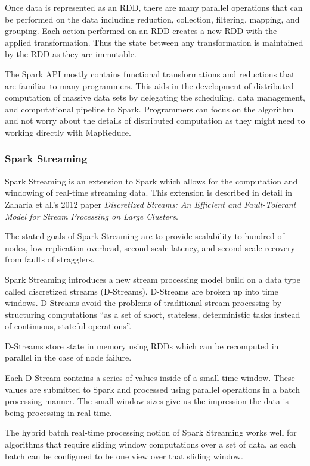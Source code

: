 \documentclass[]{article}
\begin{document}
Once data is represented as an RDD, there are many parallel operations that can be performed on the data including reduction, collection, filtering, mapping, and grouping. Each action performed on an RDD creates a new RDD with the applied transformation. Thus the state between any transformation is maintained by the RDD as they are immutable.

The Spark API mostly contains functional transformations and reductions that are familiar to many programmers. This aids in the development of distributed computation of massive data sets by delegating the scheduling, data management, and computational pipeline to Spark. Programmers can focus on the algorithm and not worry about the details of distributed computation as they might need to working directly with MapReduce.

\subsubsection{Spark Streaming}
Spark Streaming is an extension to Spark which allows for the computation and windowing of real-time streaming data. This extension is described in detail in Zaharia et al.'s 2012 paper \textit{Discretized Streams: An Efficient and Fault-Tolerant Model for Stream Processing on Large Clusters}\cite{zaharia2012discretized}.

The stated goals of Spark Streaming are to provide scalability to hundred of nodes, low replication overhead, second-scale latency, and second-scale recovery from faults of stragglers.

Spark Streaming introduces a new stream processing model build on a data type called discretized streams (D-Streams). D-Streams are broken up into time windows. D-Streams avoid the problems of traditional stream processing by structuring computations ``as a set of short, stateless, deterministic tasks instead of continuous, stateful operations''.

D-Streams store state in memory using RDDs which can be recomputed in parallel in the case of node failure. 

Each D-Stream contains a series of values inside of a small time window. These values are submitted to Spark and processed using parallel operations in a batch processing manner. The small window sizes give us the impression the data is being processing in real-time.

The hybrid batch real-time processing notion of Spark Streaming works well for algorithms that require sliding window computations over a set of data, as each batch can be configured to be one view over that sliding window.
\end{document}
